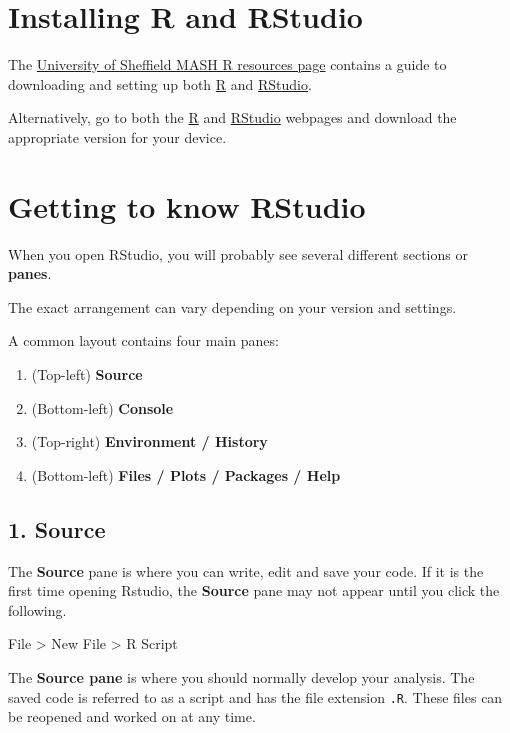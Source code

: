 \documentclass[
]{book}
\providecommand{\tightlist}{%
  \setlength{\itemsep}{0pt}\setlength{\parskip}{0pt}}
\begin{document}
\section{Installing R and RStudio}\label{installing-r-and-rstudio}

The \href{https://sheffield.ac.uk/mash/stats-resources/r}{University of Sheffield MASH R resources page} contains a guide to downloading and setting up both \href{https://cran.r-project.org/}{R} and \href{https://posit.co/products/open-source/rstudio}{RStudio}.

Alternatively, go to both the \href{https://cran.r-project.org/}{R} and \href{https://posit.co/products/open-source/rstudio}{RStudio} webpages and download the appropriate version for your device.

\section{Getting to know RStudio}\label{getting-to-know-rstudio}

When you open RStudio, you will probably see several different sections or \textbf{panes}.

The exact arrangement can vary depending on your version and settings.

A common layout contains four main panes:

\begin{enumerate}
\def\labelenumi{\arabic{enumi}.}
\tightlist
\item
  (Top-left) \textbf{Source}
\item
  (Bottom-left) \textbf{Console}
\item
  (Top-right) \textbf{Environment / History}
\item
  (Bottom-left) \textbf{Files / Plots / Packages / Help}
\end{enumerate}

\subsection{1. Source}\label{source}

The \textbf{Source} pane is where you can write, edit and save your code. If it is the first time opening Rstudio, the \textbf{Source} pane may not appear until you click the following.

File \textgreater{} New File \textgreater{} R Script

The \textbf{Source pane} is where you should normally develop your analysis. The saved code is referred to as a script and has the file extension \texttt{.R}. These files can be reopened and worked on at any time.
\end{document}

